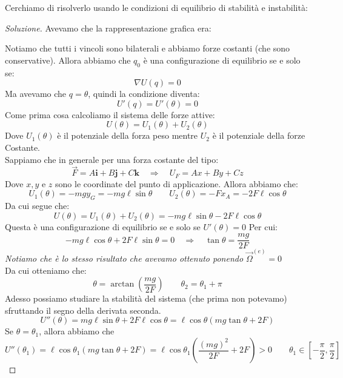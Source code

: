 \documentclass[11pt,a4paper,twoside]{article}
\theoremstyle{definition}
\newenvironment{sol}
	{\renewcommand\qedsymbol{$\blacksquare$}\begin{proof}[Soluzione]}
	{\end{proof}}
\begin{document}
Cerchiamo di risolverlo usando le condizioni di equilibrio di stabilità e instabilità:

\begin{sol}
	Avevamo che la rappresentazione grafica era:
	\begin{center}
	\end{center}
	Notiamo che tutti i vincoli sono bilaterali e abbiamo forze costanti (che sono conservative). Allora abbiamo che $q_0$ è una configurazione di equilibrio se e solo se:
	\[ \nabla U(q) = 0\]
	Ma avevamo che $q = \theta$, quindi la condizione diventa:
	\[ U'(q) = U'(\theta) = 0 \]
	Come prima cosa calcoliamo il sistema delle forze attive:
	\[ U(\theta) = U_1(\theta) + U_2(\theta) \]
	Dove $U_1(\theta)$ è il potenziale della forza peso mentre $U_2$ è il potenziale della forze Costante.\\
	Sappiamo che in generale per una forza costante del tipo:
	\[ \vec F = A\mathbf i + B \mathbf j + C \mathbf k  \quad \Rightarrow \quad U_F = Ax + By + Cz\]
	Dove $x,y$ e $z$ sono le coordinate del punto di applicazione. Allora abbiamo che:
	\[ U_1(\theta) = -mgy_G = -mg\ell \sin \theta\qquad U_2(\theta) = -Fx_A = -2F\ell \cos \theta\]
	Da cui segue che:
	\[ U(\theta) = U_1(\theta) + U_2(\theta) = -mg\ell \sin \theta - 2F\ell \cos \theta \]
	Questa è una configurazione di equilibrio se e solo se $U'(\theta) = 0$
	Per cui:
	\[ -mg\ell \cos \theta + 2F\ell \sin \theta = 0  \quad \Rightarrow \quad \tan\theta = \frac{mg}{2F} \]
	\textit{Notiamo che è lo stesso risultato che avevamo ottenuto ponendo $\vec \Omega^{(e)}=0$}\\
	Da cui otteniamo che:
	\[ \theta = \arctan\left(\frac{mg}{2F}\right) \qquad \theta_2 = \theta_1 + \pi\]
	Adesso possiamo studiare la stabilità del sistema (che prima non potevamo) sfruttando il segno della derivata seconda.
	\[ U''(\theta) = mg\ell \sin \theta + 2F\ell \cos \theta = \ell \cos \theta(mg \tan \theta + 2F) \]
	Se $\theta = \theta_1$, allora abbiamo che
	\[ U''(\theta_1) = \ell \cos \theta_1 (mg \tan \theta + 2F) = \ell \cos \theta_1 \left( \frac{(mg)^2}{2F} + 2F \right) >0 \qquad\theta_1 \in \left[ -\frac \pi 2, \frac \pi2 \right]\]

\end{sol}
\end{document}
